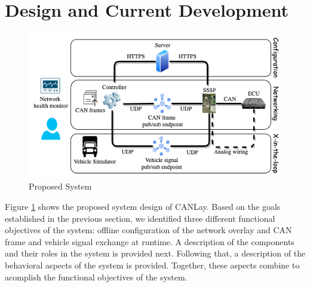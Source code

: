 \documentclass[letterpaper,twocolumn,12pt]{article}
\begin{document}




\section{Design and Current Development}\label{sec:design}
\begin{figure}[t!]
    \centering
    \includegraphics[width=\linewidth]{images/system_design.drawio.png}
    \caption{Proposed System}
    \label{fig:system}
\end{figure}
Figure \ref{fig:system} shows the proposed system design of CANLay. Based on the goals established in the previous section, we identified three different functional objectives of the system: offline configuration of the network overlay and CAN frame and vehicle signal exchange at runtime. A description of the components and their roles in the system is provided next. Following that, a description of the behavioral aspects of the system is provided. Together, these aspects combine to acomplish the functional objectives of the system.
\end{document}
